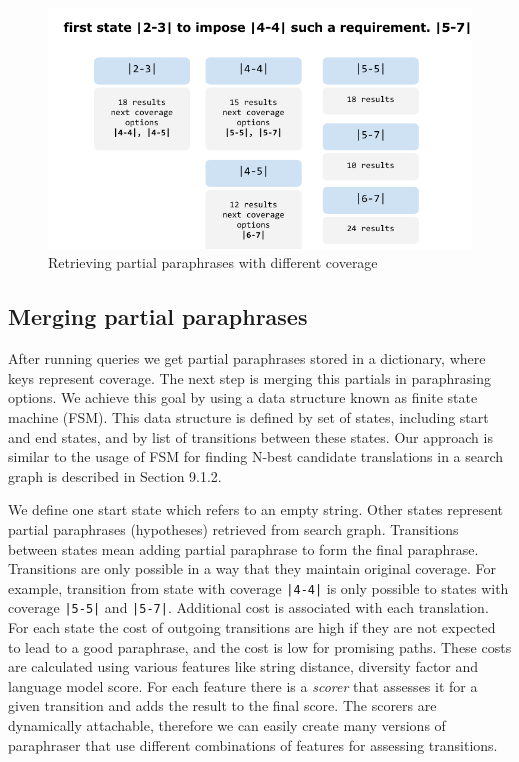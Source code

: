 \begin{figure}
 \centering 
 \includegraphics{g/coverage-expansion.pdf}
 \caption{Retrieving partial paraphrases with different coverage}
\end{figure}


\subsection{Merging partial paraphrases}

After running queries we get partial paraphrases stored in a dictionary, where keys represent coverage. The next step is merging this partials in paraphrasing options. We achieve this goal by using a data structure known as finite state machine (FSM). This data structure is defined by set of states, including start and end states, and by list of transitions between these states. Our approach is similar to the usage of FSM for finding N-best candidate translations in a search graph is described in \cite{Koehn2009a} Section 9.1.2.

We define one start state which refers to an empty string. Other states represent partial paraphrases (hypotheses) retrieved from search graph. Transitions between states mean adding partial paraphrase to form the final paraphrase. Transitions are only possible in a way that they maintain original coverage. For example, transition from state with coverage \texttt{|4-4|} is only possible to states with coverage \texttt{|5-5|} and \texttt{|5-7|}. Additional cost is associated with each translation. For each state the cost of outgoing transitions are high if they are not expected to lead to a good paraphrase, and the cost is low for promising paths. These costs are calculated using various features like string distance, diversity factor and language model score. For each feature there is a \emph{scorer} that assesses it for a given transition and adds the result to the final score. The scorers are dynamically attachable, therefore we can easily create many versions of paraphraser that use different combinations of features for assessing transitions. 

